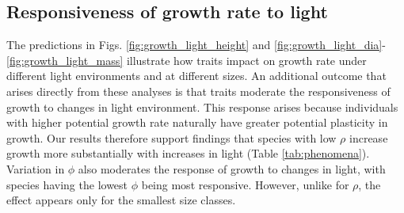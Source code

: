 \documentclass[a4paper,11pt]{article}
\begin{document}
\subsection{Responsiveness of growth rate to light}

The predictions in Figs. \ref{fig:growth_light_height} and \ref{fig:growth_light_dia}-\ref{fig:growth_light_mass} illustrate how traits impact on growth rate under different light environments and at different sizes. An additional outcome that arises directly from these analyses is that traits moderate the responsiveness of growth to changes in light environment. This response arises because individuals with higher potential growth rate naturally have greater potential plasticity in growth. Our results therefore support findings that species with low $\rho$ increase growth more substantially with increases in light (Table \ref{tab:phenomena}). Variation in $\phi$ also moderates the response of growth to changes in light, with species having the lowest $\phi$ being most responsive. However, unlike for $\rho$, the effect appears only for the smallest size classes.
\end{document}
